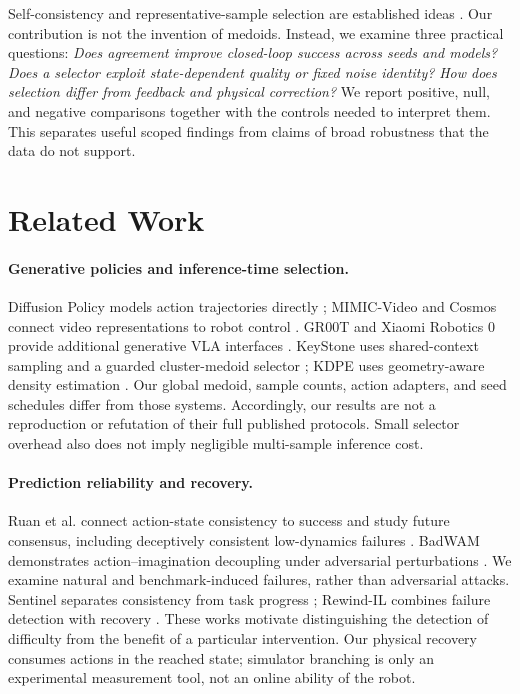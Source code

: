Self-consistency and representative-sample selection are established ideas
\citep{self_consistency,keystone,kdpe}. Our contribution is not the invention
of medoids. Instead, we examine three practical questions:
\emph{Does agreement improve closed-loop success across seeds and models?}
\emph{Does a selector exploit state-dependent quality or fixed noise identity?}
\emph{How does selection differ from feedback and physical correction?}
We report positive, null, and negative comparisons together with the controls
needed to interpret them. This separates useful scoped findings from claims
of broad robustness that the data do not support.

\section{Related Work}
\paragraph{Generative policies and inference-time selection.}
Diffusion Policy models action trajectories directly
\citep{diffusion_policy}; MIMIC-Video and Cosmos connect video representations
to robot control \citep{mimic_video,cosmos_policy}. GR00T and Xiaomi Robotics 0
provide additional generative VLA interfaces \citep{groot17,xiaomi0}.
KeyStone uses shared-context sampling and a guarded cluster-medoid selector
\citep{keystone}; KDPE uses geometry-aware density estimation
\citep{kdpe}. Our global medoid, sample counts, action adapters, and seed
schedules differ from those systems. Accordingly, our results are not a
reproduction or refutation of their full published protocols. Small
selector overhead also does not imply negligible multi-sample inference cost.

\paragraph{Prediction reliability and recovery.}
Ruan et al. connect action-state consistency to success and study future
consensus, including deceptively consistent low-dynamics failures
\citep{future_compatible}. BadWAM demonstrates action--imagination
decoupling under adversarial perturbations \citep{badwam}.
We examine natural and benchmark-induced failures, rather than adversarial
attacks. Sentinel separates consistency from task progress
\citep{sentinel}; Rewind-IL combines failure detection with recovery
\citep{rewind_il}. These works motivate distinguishing the detection of
difficulty from the benefit of a particular intervention. Our physical
recovery consumes actions in the reached state; simulator branching is only
an experimental measurement tool, not an online ability of the robot.

